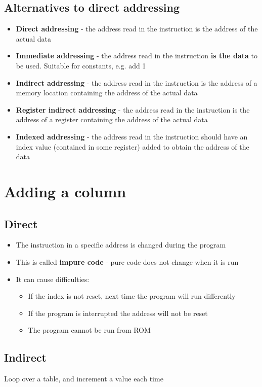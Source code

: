 \documentclass{article}[18pt]
\begin{document}
\subsection{Alternatives to direct addressing}
\begin{itemize}
	\item \textbf{Direct addressing} - the address read in the instruction is the address of the actual data
	\item \textbf{Immediate addressing} - the address read in the instruction \textbf{is the data} to be used. Suitable for constants, e.g. add 1
	\item \textbf{Indirect addressing} - the address read in the instruction is the address of a memory location containing the address of the actual data
	\item \textbf{Register indirect addressing} - the address read in the instruction is the address of a register containing the address of the actual data
	\item \textbf{Indexed addressing} - the address read in the instruction should have an index value (contained in some register) added to obtain the address of the data
\end{itemize}
\section{Adding a column}
\subsection{Direct}
\begin{itemize}
	\item The instruction in a specific address is changed during the program
	\item This is called \textbf{impure code} - pure code does not change when it is run
	\item It can cause difficulties:
	\begin{itemize}
		\item If the index is not reset, next time the program will run differently
		\item If the program is interrupted the address will not be reset
		\item The program cannot be run from ROM
	\end{itemize}
\end{itemize}
\subsection{Indirect}
Loop over a table, and increment a value each time
\end{document}
